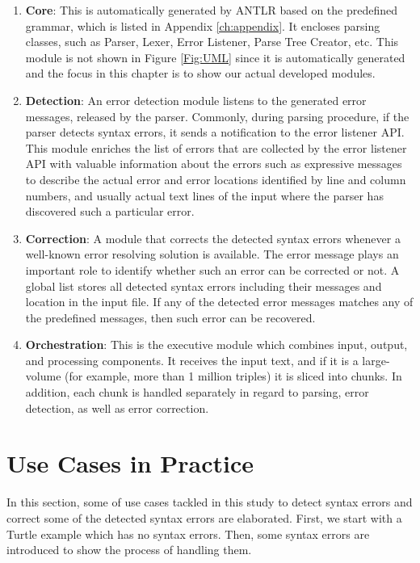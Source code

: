 \begin{enumerate}[]
 \item \textbf {Core}: This is automatically generated by ANTLR based on the predefined grammar, which is listed in Appendix \ref{ch:appendix}. 
 It encloses parsing classes, such as Parser, Lexer, Error Listener, Parse Tree Creator, etc. This module is not shown in Figure \ref{Fig:UML} since it is automatically generated and the focus in this chapter is to show our actual developed modules. 
\item \textbf{Detection}: An error detection module listens to the generated error messages, released by the parser. 
Commonly, during parsing procedure, if the parser detects syntax errors, it sends a notification to the error listener API. 
This module enriches the list of errors that are collected by the error listener API with valuable information about the errors such as  expressive messages to describe the actual error and error locations identified by line and column numbers, and usually  actual text lines  of the input where the parser has discovered such a particular error.

\item \textbf {Correction}: A module that corrects the detected syntax errors whenever a well-known error resolving solution is available. 
The error message plays an important role to identify whether such an error can be corrected or not. 
A global list stores all detected syntax errors including their messages and location in the input file. 
If any of the detected error messages matches any of the predefined messages, then such error can be recovered.

\item \textbf{Orchestration}: %
This is the executive module which combines input, output, and processing components. 
It receives the input text, and if it is a large-volume (for example, more than 1 million triples) it is sliced into  chunks. In addition, each chunk is handled separately in regard to parsing, error detection, as well as error correction.

\end{enumerate} 


\section{Use Cases in Practice}
In this section, some of use cases tackled in this study to detect syntax errors and correct some of the detected syntax errors are elaborated. 
First, we start with a Turtle example which has no syntax errors. Then, some syntax errors are introduced to show the process of handling them. 


